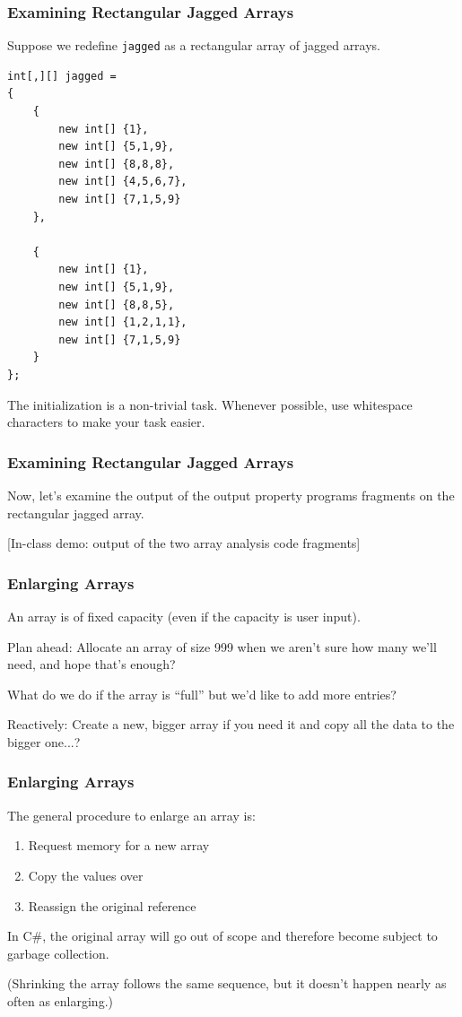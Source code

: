 \begin{frame}[fragile]
\frametitle{Examining Rectangular Jagged Arrays}
Suppose we redefine \texttt{jagged} as a rectangular array of jagged arrays.

{\scriptsize
\begin{verbatim}
int[,][] jagged = 
{
    {	
        new int[] {1}, 
        new int[] {5,1,9}, 
        new int[] {8,8,8}, 
        new int[] {4,5,6,7}, 
        new int[] {7,1,5,9} 
    },

    {	
        new int[] {1},
        new int[] {5,1,9},
        new int[] {8,8,5},
        new int[] {1,2,1,1},
        new int[] {7,1,5,9} 
    }
};
\end{verbatim}
}

The initialization is a non-trivial task.  Whenever possible, use whitespace characters to make your task easier.

\end{frame}

\begin{frame}
\frametitle{Examining Rectangular Jagged Arrays}

Now, let's examine the output of the output property programs fragments on the rectangular jagged array.

[In-class demo: output of the two array analysis code fragments]

\end{frame}



\begin{frame}
\frametitle{Enlarging Arrays}

An array is of fixed capacity (even if the capacity is user input).

Plan ahead: Allocate an array of size 999 when we aren't sure how many we'll need, and hope that's enough?

What do we do if the array is ``full'' but we'd like to add more entries?

Reactively: Create a new, bigger array if you need it and copy all the data to the bigger one...? 

\end{frame}

\begin{frame}
\frametitle{Enlarging Arrays}
The general procedure to enlarge an array is:

\begin{enumerate}
	\item Request memory for a new array
 	\item Copy the values over
	\item Reassign the original reference
\end{enumerate}

In C\#, the original array will go out of scope and therefore become subject to garbage collection.

(Shrinking the array follows the same sequence, but it doesn't happen nearly as often as enlarging.)

\end{frame}

